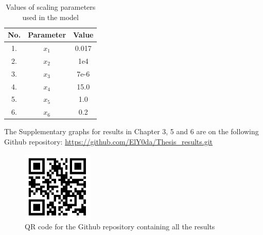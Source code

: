 \begin{table}[p]
  \centering
  \begin{tabular}{|c|c|c|}
    \hline
    \textbf{No.} & \textbf{Parameter} & \textbf{Value} \\
    \hline
    1. & $x_{1}$ & 0.017 \\
    \hline
    2. & $x_{2}$ & 1e4 \\
    \hline
    3. & $x_{3}$ & 7e-6 \\
    \hline
    4. & $x_{4}$ & 15.0 \\
    \hline
    5. & $x_{5}$ & 1.0 \\
    \hline
    6. & $x_{6}$ & 0.2 \\
    \hline
  \end{tabular}
  \caption{Values of scaling parameters used in the model}
  \label{tab:scale_param}
\end{table}
\clearpage
\noindent The Supplementary graphs for results in Chapter 3, 5 and 6 are on the following Github repository: \url{https://github.com/ElY0da/Thesis_results.git}
\begin{figure}[h]
  \centering
  \includegraphics[width=0.3\textwidth]{CA2/github_thesis_results}
  \caption{QR code for the Github repository containing all the results}
\end{figure}
\clearpage
